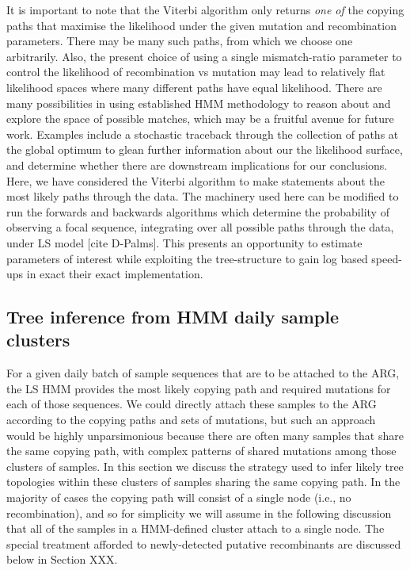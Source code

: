 \documentclass{article}
\begin{document}
It is important to note that the Viterbi algorithm only returns
\emph{one of} the copying paths that maximise the likelihood under
 the given mutation and recombination parameters. There may be many
such paths, from which we choose one arbitrarily. Also, the
present choice of using a single mismatch-ratio parameter to control
the likelihood of recombination vs mutation may lead to relatively
flat likelihood spaces where many different paths have equal likelihood.
There are many possibilities in using established HMM methodology
to reason about and explore the space of possible matches, which may
be a fruitful avenue for future work. Examples include a stochastic traceback through the collection of paths at the global optimum to glean further information about our the likelihood surface, and determine whether there are downstream implications for our conclusions. Here, we have considered the Viterbi algorithm to make statements about the most likely paths through the data. The machinery used here can be modified to run the forwards and backwards algorithms which determine the probability of observing a focal sequence, integrating over all possible paths through the data, under LS model [cite D-Palms]. This presents an opportunity to estimate parameters of interest while exploiting the tree-structure to gain log based speed-ups in exact their exact implementation.

\subsection{Tree inference from HMM daily sample clusters}
\label{sec:sample-cluster-tree-inference}
For a given daily batch of sample sequences that are to be attached to the
ARG, the LS HMM provides the most likely copying path and required mutations
for each of those sequences. We could directly attach these samples to
the ARG according to the copying paths and sets of mutations, but
such an approach would be highly unparsimonious because there are
often many samples that share the same copying path, with
complex patterns of shared mutations among those clusters of samples.
In this section we discuss the strategy used to infer likely tree
topologies within these clusters of samples sharing the same copying path.
In the majority of cases the copying path will consist of a single
node (i.e., no recombination), and so for simplicity we will assume in the
following discussion that all of the samples in a HMM-defined cluster
attach to a single node. The special treatment afforded to
newly-detected putative recombinants are discussed below
in Section XXX.
\end{document}
